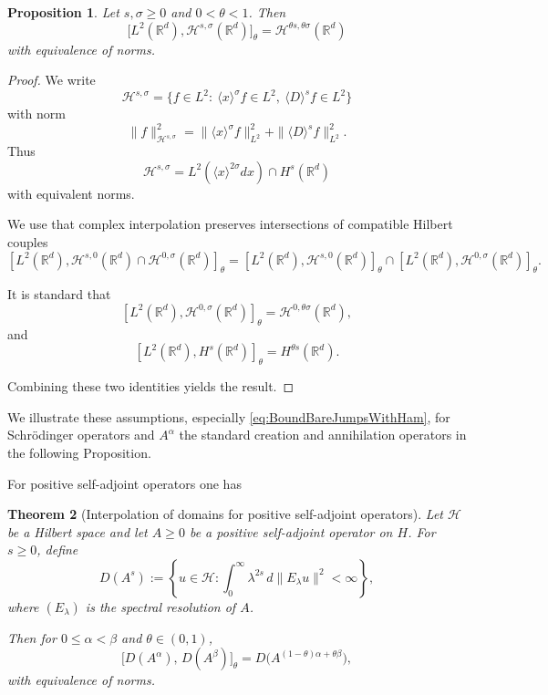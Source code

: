 \documentclass[11pt]{amsart}
\newcommand{\1}{\mathbbm{1}}
\theoremstyle{plain}
\newtheorem{theorem}{Theorem}[section]
\newtheorem{proposition}[theorem]{Proposition}
\theoremstyle{definition}
\theoremstyle{remark}
\numberwithin{equation}{section}
\begin{document}
\begin{proposition}
\label{prop:interp}
Let $s,\sigma \ge 0$ and $0<\theta<1$. Then
\[
\bigl[L^2(\mathbb{R}^d),\mathcal{H}^{s,\sigma}(\mathbb{R}^d)\bigr]_\theta
=
\mathcal{H}^{\theta s,\theta\sigma}(\mathbb{R}^d)
\]
with equivalence of norms.
\end{proposition}

\begin{proof}
We write
\[
\mathcal{H}^{s,\sigma}
=
\{f\in L^2:\ \langle x\rangle^\sigma f\in L^2,\ \langle D\rangle^s f\in L^2\}
\]
with norm
\[
\|f\|_{\mathcal{H}^{s,\sigma}}^2
=
\|\langle x\rangle^\sigma f\|_{L^2}^2
+
\|\langle D\rangle^s f\|_{L^2}^2.
\]
Thus
\[
\mathcal{H}^{s,\sigma}
=
L^2(\langle x\rangle^{2\sigma}dx) \cap H^s(\mathbb{R}^d)
\]
with equivalent norms.

We use that complex interpolation preserves intersections of compatible Hilbert couples \cite{Peetre1974}
\[
[L^2(\mathbb R^d), \mathcal H^{s,0}(\mathbb R^d)\cap \mathcal H^{0,\sigma}(\mathbb R^d)]_\theta
=
[L^2(\mathbb R^d),\mathcal H^{s,0}(\mathbb R^d)]_\theta \cap [L^2(\mathbb R^d),\mathcal H^{0,\sigma}(\mathbb R^d)]_\theta.
\]

It is standard \cite[Thm. 5.5.3]{BerghLofstrom1976} that
\[
[L^2(\mathbb{R}^d), \mathcal H^{0,\sigma}(\mathbb R^d)]_\theta
=
\mathcal H^{0,\theta \sigma}(\mathbb R^d),
\]
and
\[
[L^2(\mathbb{R}^d),H^{s}(\mathbb{R}^d)]_\theta
=
H^{\theta s}(\mathbb{R}^d).
\]

Combining these two identities yields the result.
\end{proof}

\noindent We illustrate these assumptions, especially \eqref{eq:BoundBareJumpsWithHam}, for Schr\"odinger operators and $A^{\alpha}$ the standard creation and annihilation operators in the following Proposition. 

For positive self-adjoint operators one has \cite[Theo.4.17]{Lunardi2018} 
\begin{theorem}[Interpolation of domains for positive self-adjoint operators]
\label{thm:interpolation}
Let $\mathcal H$ be a Hilbert space and let $A \ge 0$ be a positive self-adjoint operator on $H$. 
For $s \ge 0$, define
\[
D(A^s) := \left\{ u \in \mathcal H : \int_0^\infty \lambda^{2s} \, d\|E_\lambda u\|^2 < \infty \right\},
\]
where $(E_\lambda)$ is the spectral resolution of $A$.

Then for $0 \le \alpha < \beta$ and $\theta \in (0,1)$,
\[
\bigl[ D(A^\alpha), \, D(A^\beta) \bigr]_\theta 
= D\bigl(A^{(1-\theta)\alpha + \theta \beta}\bigr),
\]
with equivalence of norms.
\end{theorem}
\end{document}
